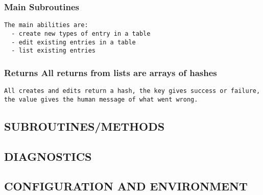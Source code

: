 \documentclass{book}
\begin{document}
\subsubsection{Main Subroutines}
\label{Inventory::Hosts_Main_Subroutines}
\hypertarget{Inventory::Hosts_Main_Subroutines}{}


\begin{Verbatim}[fontfamily=courier,gobble=1,frame=lines,fontsize=\small]
 The main abilities are:
  - create new types of entry in a table
  - edit existing entries in a table
  - list existing entries
\end{Verbatim}


\subsubsection{Returns All returns from lists are arrays of hashes}
\label{Inventory::Hosts_Returns_All_returns_from_lists_are_arrays_of_hashes}
\hypertarget{Inventory::Hosts_Returns_All_returns_from_lists_are_arrays_of_hashes}{}


\begin{lstlisting}[frame=lines,gobble=1]
 All creates and edits return a hash, the key gives success or failure, the value gives the human message of what went wrong.
\end{lstlisting}


\subsection{SUBROUTINES/METHODS}
\label{Inventory::Hosts_SUBROUTINES_METHODS}
\hypertarget{Inventory::Hosts_SUBROUTINES_METHODS}{}


\subsection{DIAGNOSTICS}
\label{Inventory::Hosts_DIAGNOSTICS}
\hypertarget{Inventory::Hosts_DIAGNOSTICS}{}


\subsection{CONFIGURATION AND ENVIRONMENT}
\label{Inventory::Hosts_CONFIGURATION_AND_ENVIRONMENT}
\hypertarget{Inventory::Hosts_CONFIGURATION_AND_ENVIRONMENT}{}
\end{document}
